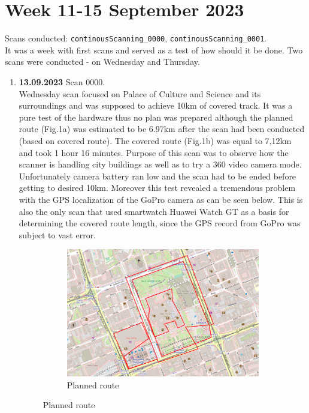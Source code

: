\documentclass[a4paper,12pt]{article}
\begin{document}
\section{Week 11-15 September 2023}
Scans conducted: \verb|continousScanning_0000|, \verb|continousScanning_0001|.\\
It was a week with first scans and served as a test of how should it be done. Two scans were conducted - on Wednesday and Thursday.
\begin{enumerate}
	\item \textbf{13.09.2023} Scan 0000. \\
	 Wednesday scan focused on Palace of Culture and Science and its surroundings and was supposed to achieve 10km of covered track. It was a pure test of the hardware thus no plan was prepared although the planned route (Fig.1a) was estimated to be 6.97km after the scan had been conducted (based on covered route). The covered route (Fig.1b) was equal to 7,12km and took 1 hour 16 minutes. Purpose of this scan was to observe how the scanner is handling city buildings as well as to try a 360 video camera mode. Unfortunately camera battery ran low and the scan had to be ended before getting to desired 10km. Moreover this test revealed a tremendous problem with the GPS localization of the GoPro camera as can be seen below. This is also the only scan that used smartwatch Huawei Watch GT as a basis for determining the covered route length, since the GPS record from GoPro was subject to vast error.
	\begin{figure}[H]
		\centering
		\begin{subfigure}{.90\textwidth}
			\centering
			\includegraphics[width=1\linewidth]{route_p0}
			\caption{Planned route}
			\label{fig:a0}

\end{subfigure}
\end{figure}
\end{enumerate}
\end{document}
